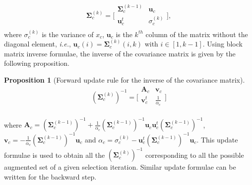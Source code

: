 \documentclass[journal,peerreview,onecolumn]{IEEEtran}
\newtheorem{prop}{Proposition}
\begin{document}
        \begin{equation}\label{eq:cov}
            \boldsymbol{\Sigma}_c^{(k)} =
            \bigg[\begin{array}{cc}
            \boldsymbol{\Sigma}^{(k-1)}_c & \mathbf{u}_c      \\
            \mathbf{u}_c^t          & \sigma^{(k)}_c \\
            \end{array}\bigg],
        \end{equation}
        where  $\sigma^{(k)}_c$  is  the variance  of  $x_c$,
        $\mathbf{u}_c$ is  the $k^{th}$  column of the  matrix without
        the          diagonal           element,          \emph{i.e.},
        $\mathbf{u}_{c}(i) =  \boldsymbol{\Sigma}^{(k)}_{c}(i,k)$ with
        $i  \in [1,k-1]$.   Using block  matrix inverse  formulae, the
        inverse of  the covariance  matrix is  given by  the following
        proposition.
        \begin{prop}[Forward update rule for the inverse of the covariance matrix]
        \label{eq:update-inv}
        \begin{equation}\label{eq:cov:inv}
                (\boldsymbol{\Sigma}_c^{(k)})^{-1} =
                \bigg[\begin{array}{cc}
                \mathbf{A}_c & \mathbf{v}_c \\
                \mathbf{v}_c^t  & \frac{1}{\alpha_c} \\
                \end{array}\bigg]
            \end{equation}
        \end{prop}
        \noindent                                                where
        $\mathbf{A}_c     =     (\boldsymbol{\Sigma}^{(k-1)}_c)^{-1}     +
        \frac{1}{\alpha_c} (\boldsymbol{\Sigma}^{(k-1)}_c)^{-1} \mathbf{u}_c
        \mathbf{u}_c^t              (\boldsymbol{\Sigma}^{(k-1)}_c)^{-1}$,
        $\mathbf{v}_c           =           -           \frac{1}{\alpha_c}
        (\boldsymbol{\Sigma}^{(k-1)}_c)^{-1}       \mathbf{u}_c$       and
        $      \alpha_c      =      \sigma^{(k)}_c      -      \mathbf{u}_c^t
        (\boldsymbol{\Sigma}^{(k-1)}_c)^{-1}  \mathbf{u}_c$.  This  update
        formulae      is     used      to      obtain     all      the
        $(\boldsymbol{\Sigma}^{(k)}_c)^{-1}$  corresponding  to all  the
        possible augmented set of a given selection iteration. Similar
        update formulae can be written for the backward step.
\end{document}
